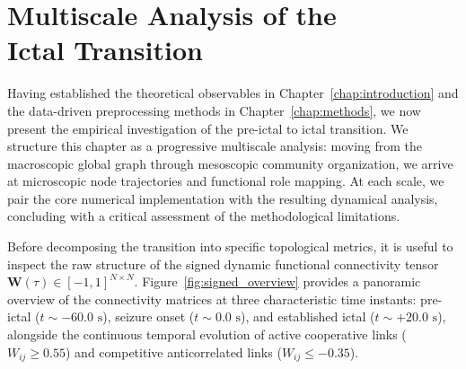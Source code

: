 \chapter[Multiscale Analysis of the Ictal Transition]{Multiscale Analysis of the\\Ictal Transition}
\label{chap:results}

Having established the theoretical observables in Chapter~\ref{chap:introduction} and the data-driven preprocessing methods in Chapter~\ref{chap:methods}, we now present the empirical investigation of the pre-ictal to ictal transition. We structure this chapter as a progressive multiscale analysis: moving from the macroscopic global graph through mesoscopic community organization, we arrive at microscopic node trajectories and functional role mapping. At each scale, we pair the core numerical implementation with the resulting dynamical analysis, concluding with a critical assessment of the methodological limitations.

Before decomposing the transition into specific topological metrics, it is useful to inspect the raw structure of the signed dynamic functional connectivity tensor $\mathbf{W}(\tau) \in [-1, 1]^{N \times N}$. Figure~\ref{fig:signed_overview} provides a panoramic overview of the connectivity matrices at three characteristic time instants: pre-ictal ($t \sim -60.0\text{ s}$), seizure onset ($t \sim 0.0\text{ s}$), and established ictal ($t \sim +20.0\text{ s}$), alongside the continuous temporal evolution of active cooperative links ($W_{ij} \geq 0.55$) and competitive anticorrelated links ($W_{ij} \leq -0.35$).

